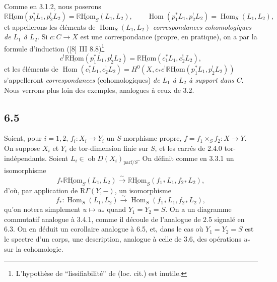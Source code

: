 \documentclass[11pt]{article}
\DeclareMathOperator{\Hom}{Hom}
\newcommand{\R}{\mathbb{R}}\newcommand{\RHomCore}{\mathbb{R}\mathrm{Hom}}
\providecommand{\RHom}{\RHomCore}
\providecommand{\uRHom}{\underline{\RHom}}
\providecommand{\RHom}{\RHomCore}
\providecommand{\Hom}{\operatorname{Hom}}
\providecommand{\RHom}{\R\mathcal{H}om}
\providecommand{\R}{\mathrm R}
\providecommand{\RHom}{\RHomCore}
\providecommand{\Hom}{\operatorname{Hom}}
\begin{document}
Comme en 3.1.2, nous poserons
\begin{equation}
\tag{6.4.3}
\uRHom(p_1^*L_1,p_2^!L_2)=\uRHom_S(L_1,L_2),\qquad
\Hom(p_1^*L_1,p_2^!L_2)=\Hom_S(L_1,L_2),
\end{equation}
et appellerons les éléments de $\Hom_S(L_1,L_2)$ \emph{correspondances cohomologiques de $L_1$ à $L_2$}. Si $c:C\to X$ est une correspondance (propre, en pratique), on a par la formule d'induction ([8] III 8.8)\footnote{L'hypothèse de ``lissifiabilité'' de (loc. cit.) est inutile.}
\begin{equation}
\tag{6.4.4}
c^!\uRHom(p_1^*L_1,p_2^!L_2)=\uRHom(c_1^*L_1,c_2^!L_2),
\end{equation}
et les
éléments de $\Hom(c_1^*L_1,c_2^!L_2)=H^0(X,c_*c^!\uRHom(p_1^*L_1,p_2^!L_2))$ s'appelleront \emph{correspondances} (cohomologiques) \emph{de $L_1$ à $L_2$ à support dans $C$}. Nous verrons plus loin des exemples, analogues à ceux de 3.2.

\subsection*{6.5}
Soient, pour $i=1,2$, $f_i:X_i\to Y_i$ un $S$-morphisme propre, $f=f_1\times_Sf_2:X\to Y$. On suppose $X_i$ et $Y_i$ de tor-dimension finie sur $S$, et les carrés de 2.4.0 tor-indépendants. Soient $L_i\in\operatorname{ob}D(X_i)_{\mathrm{parf}/S}$. On définit comme en 3.3.1 un isomorphisme
\begin{equation}
\tag{6.5.1}
f_*\uRHom_S(L_1,L_2)\xrightarrow{\sim}\uRHom_S(f_{1*}L_1,f_{2*}L_2),
\end{equation}
d'où, par application de $\mathrm{R}\Gamma(Y,-)$, un isomorphisme
\begin{equation}
\tag{6.5.2}
f_*:\Hom_S(L_1,L_2)\xrightarrow{\sim}\Hom_S(f_{1*}L_1,f_{2*}L_2),
\end{equation}
qu'on notera simplement $u\mapsto u_*$ quand $Y_1=Y_2=S$. On a un diagramme commutatif analogue à 3.4.1, comme il découle de l'analogue de 2.5 signalé en 6.3. On en déduit un corollaire analogue à 6.5, et, dans le cas où $Y_1=Y_2=S$ est le spectre d'un corps, une description, analogue à celle de 3.6, des opérations $u_*$ sur la cohomologie.
\end{document}
